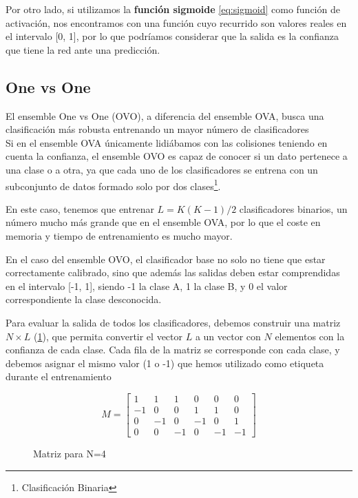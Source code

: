 Por otro lado, si utilizamos la \textbf{función sigmoide} \eqref{eq:sigmoid} como función
de activación, nos encontramos con una función cuyo recurrido son
valores reales en el intervalo {[}0, 1{]}, por lo que podríamos
considerar que la salida es la confianza que tiene la red ante una
predicción.

\hypertarget{one-vs-one}{%
\subsection{One vs One}\label{one-vs-one}}

El ensemble One vs One (OVO), a diferencia del ensemble OVA, busca una
clasificación más robusta entrenando un mayor número de clasificadores\\
Si en el ensemble OVA únicamente lidiábamos con las colisiones teniendo en cuenta
la confianza, el ensemble OVO es capaz de conocer si un dato pertenece a
una clase o a otra, ya que cada uno de los clasificadores se entrena con
un subconjunto de datos formado solo por dos clases\footnote{Clasificación Binaria}.

En este caso, tenemos que entrenar $L = K(K-1)/2$ clasificadores binarios,
un número mucho más grande que en el ensemble OVA, por lo que el coste
en memoria y tiempo de entrenamiento es mucho mayor.

En el caso del ensemble OVO, el clasificador base no solo no tiene que
estar correctamente calibrado, sino que además las salidas deben estar
comprendidas en el intervalo {[}-1, 1{]}, siendo -1 la clase A, 1 la
clase B, y 0 el valor correspondiente la clase desconocida.

Para evaluar la salida de todos los clasificadores, debemos construir
una matriz $N \times L$ (\ref{fig:matrix-ovo}), que permita convertir el vector $L$ a un vector con $N$
elementos con la confianza de cada clase. Cada fila de la matriz se
corresponde con cada clase, y debemos asignar el mismo valor (1 o -1)
que hemos utilizado como etiqueta durante el entrenamiento
\begin{figure}[h]
    \centering
    $$
    M = 
    \begin{bmatrix}
    1 & 1 & 1 & 0 & 0 & 0 \\
    -1 & 0 & 0 &  1 & 1 & 0 \\
    0 & -1 & 0 & -1 & 0 & 1 \\
    0 & 0 & -1 & 0 & -1 & -1 
    
    \end{bmatrix}
    $$
    \label{fig:matrix-ovo}
    \caption{Matriz para N=4}
\end{figure}


